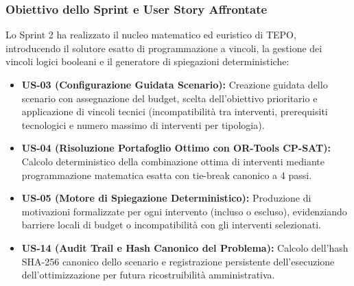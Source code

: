 \subsubsection{Obiettivo dello Sprint e User Story Affrontate}
Lo Sprint 2 ha realizzato il nucleo matematico ed euristico di TEPO, introducendo il solutore esatto di programmazione a vincoli, la gestione dei vincoli logici booleani e il generatore di spiegazioni deterministiche:
\begin{itemize}[leftmargin=1.5em, itemsep=0.2em]
    \item \textbf{US-03 (Configurazione Guidata Scenario):} Creazione guidata dello scenario con assegnazione del budget, scelta dell'obiettivo prioritario e applicazione di vincoli tecnici (incompatibilità tra interventi, prerequisiti tecnologici e numero massimo di interventi per tipologia).
    \item \textbf{US-04 (Risoluzione Portafoglio Ottimo con OR-Tools CP-SAT):} Calcolo deterministico della combinazione ottima di interventi mediante programmazione matematica esatta con tie-break canonico a 4 passi.
    \item \textbf{US-05 (Motore di Spiegazione Deterministico):} Produzione di motivazioni formalizzate per ogni intervento (incluso o escluso), evidenziando barriere locali di budget o incompatibilità con gli interventi selezionati.
    \item \textbf{US-14 (Audit Trail e Hash Canonico del Problema):} Calcolo dell'hash SHA-256 canonico dello scenario e registrazione persistente dell'esecuzione dell'ottimizzazione per futura ricostruibilità amministrativa.
\end{itemize}


